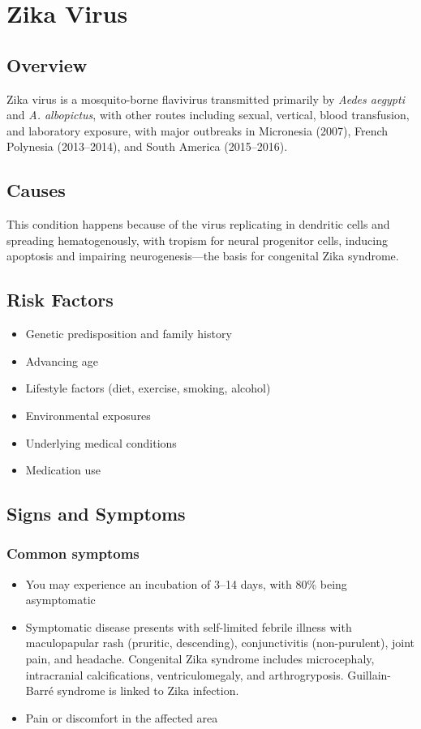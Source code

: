 \chapter{Zika Virus}
\label{sec:Zika Virus}

\section{Overview}
Zika virus is a mosquito-borne flavivirus transmitted primarily by \textit{Aedes aegypti} and \textit{A. albopictus}, with other routes including sexual, vertical, blood transfusion, and laboratory exposure, with major outbreaks in Micronesia (2007), French Polynesia (2013--2014), and South America (2015--2016).
\section{Causes}
This condition happens because of the virus replicating in dendritic cells and spreading hematogenously, with tropism for neural progenitor cells, inducing apoptosis and impairing neurogenesis---the basis for congenital Zika syndrome.     
\section{Risk Factors}

\begin{itemize}[noitemsep]
  \item Genetic predisposition and family history
  \item Advancing age
  \item Lifestyle factors (diet, exercise, smoking, alcohol)
  \item Environmental exposures
  \item Underlying medical conditions
  \item Medication use
\end{itemize}
\section{Signs and Symptoms}

\subsection{Common symptoms}
\begin{itemize}[noitemsep]
  \item You may experience an incubation of 3--14 days, with 80\% being asymptomatic
  \item Symptomatic disease presents with self-limited febrile illness with maculopapular rash (pruritic, descending), conjunctivitis (non-purulent), joint pain, and headache. Congenital Zika syndrome includes microcephaly, intracranial calcifications, ventriculomegaly, and arthrogryposis. Guillain-Barré syndrome is linked to Zika infection.
  \item Pain or discomfort in the affected area
  \end{itemize}


